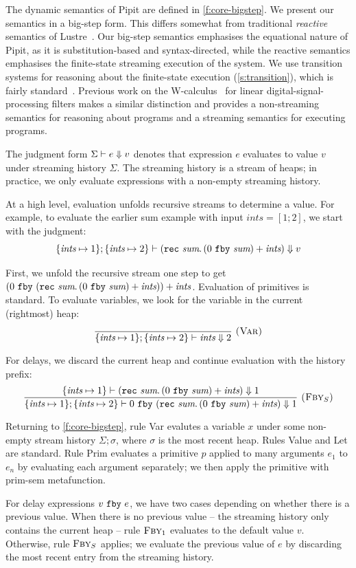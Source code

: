 \documentclass[a4paper,UKenglish,cleveref, autoref, thm-restate,anonymous]{lipics-v2021}
\begin{document}
The dynamic semantics of Pipit are defined in \autoref{f:core-bigstep}.
We present our semantics in a big-step form.
This differs somewhat from traditional \emph{reactive} semantics of Lustre~\cite{caspi1995functional}.
Our big-step semantics emphasises the equational nature of Pipit, as it is substitution-based and syntax-directed, while the reactive semantics emphasises the finite-state streaming execution of the system.
We use transition systems for reasoning about the finite-state execution (\autoref{s:transition}), which is fairly standard~\cite{brun2023equation,champion2016kind2,raymond2008synchronous}.
Previous work on the {\sc W-calculus}~\cite{gallego2021w} for linear digital-signal-processing filters makes a similar distinction and provides a non-streaming semantics for reasoning about programs and a streaming semantics for executing programs.


The judgment form $\Sigma \vdash e \Downarrow v$ denotes that expression $e$ evaluates to value $v$ under streaming history $\Sigma$.
The streaming history is a stream of heaps; in practice, we only evaluate expressions with a non-empty streaming history.

At a high level, evaluation unfolds recursive streams to determine a value.
For example, to evaluate the earlier sum example with input $\textit{ints} = [1; 2]$, we start with the judgment:
$$
\{ \textit{ints} \mapsto 1 \}; \{ \textit{ints} \mapsto 2 \} \vdash (\texttt{rec}~\textit{sum}.\, (0~\texttt{fby}~\textit{sum}) + \textit{ints}) \Downarrow v
$$

First, we unfold the recursive stream one step to get $(0~\texttt{fby}~(\texttt{rec}~\textit{sum}.\, (0~\texttt{fby}~\textit{sum}) + \textit{ints})) + \textit{ints}$.
Evaluation of primitives is standard.
To evaluate variables, we look for the variable in the current (rightmost) heap:
$$
\enskip \frac {\displaystyle 
} {\displaystyle 
  \{ \textit{ints} \mapsto 1 \}; \{ \textit{ints} \mapsto 2 \} \vdash \textit{ints} \Downarrow 2
} \  \textsc{(Var)} \enskip
$$

For delays, we discard the current heap and continue evaluation with the history prefix:
$$
\enskip \frac {\displaystyle 
  \{ \textit{ints} \mapsto 1 \} \vdash (\texttt{rec}~\textit{sum}.\, (0~\texttt{fby}~\textit{sum}) + \textit{ints}) \Downarrow 1
} {\displaystyle 
  \{ \textit{ints} \mapsto 1 \}; \{ \textit{ints} \mapsto 2 \} \vdash 0~\texttt{fby}~(\texttt{rec}~\textit{sum}.\, (0~\texttt{fby}~\textit{sum}) + \textit{ints}) \Downarrow 1
} \  \textsc{($\mbox{Fby}_S$)} \enskip
$$

Returning to \autoref{f:core-bigstep},
rule {\sc Var} evalutes a variable $x$ under some non-empty stream history $\Sigma; \sigma$, where $\sigma$ is the most recent heap.
Rules {\sc Value} and {\sc Let} are standard.
Rule {\sc Prim} evaluates a primitive $p$ applied to many arguments $e_1$ to $e_n$ by evaluating each argument separately; we then apply the primitive with prim-sem metafunction.


For delay expressions $v~\texttt{fby}~e$, we have two cases depending on whether there is a previous value.
When there is no previous value -- the streaming history only contains the current heap -- rule $\textsc{Fby}_1$ evaluates to the default value $v$.
Otherwise, rule $\textsc{Fby}_S$ applies; we evaluate the previous value of $e$ by discarding the most recent entry from the streaming history.
\end{document}
